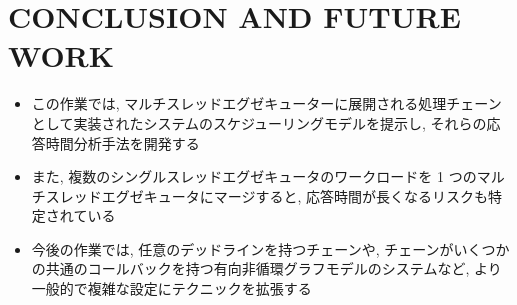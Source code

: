 
\section{CONCLUSION AND FUTURE WORK}
\label{sec: conclusion and future work}

\begin{frame}{}
    \begin{itemize}
        \item この作業では, マルチスレッドエグゼキューターに展開される処理チェーンとして実装されたシステムのスケジューリングモデルを提示し, それらの応答時間分析手法を開発する
\item また, 複数のシングルスレッドエグゼキュータのワークロードを 1 つのマルチスレッドエグゼキュータにマージすると, 応答時間が長くなるリスクも特定されている
\item 今後の作業では, 任意のデッドラインを持つチェーンや, チェーンがいくつかの共通のコールバックを持つ有向非循環グラフモデルのシステムなど, より一般的で複雑な設定にテクニックを拡張する
    \end{itemize}
\end{frame}
